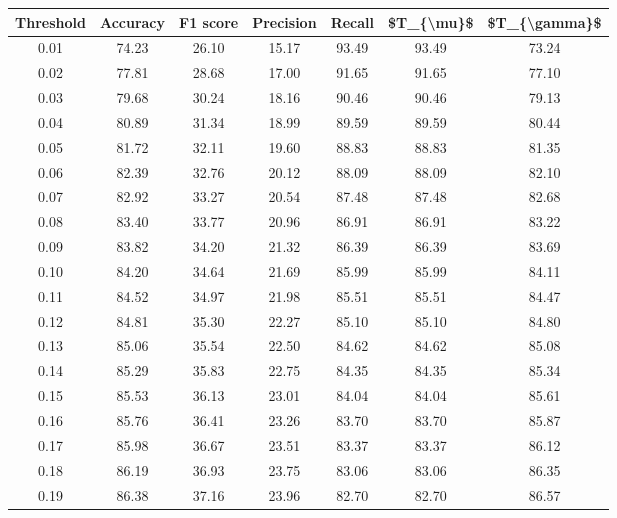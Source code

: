 \begin{tabular}{|c|c|c|c|c|c|c|}
\hline
 Threshold &  Accuracy &  F1 score &  Precision &  Recall &  \$T\_\{\textbackslash mu\}\$ &  \$T\_\{\textbackslash gamma\}\$ \\
\hline
      0.01 &     74.23 &     26.10 &      15.17 &   93.49 &      93.49 &         73.24 \\
      0.02 &     77.81 &     28.68 &      17.00 &   91.65 &      91.65 &         77.10 \\
      0.03 &     79.68 &     30.24 &      18.16 &   90.46 &      90.46 &         79.13 \\
      0.04 &     80.89 &     31.34 &      18.99 &   89.59 &      89.59 &         80.44 \\
      0.05 &     81.72 &     32.11 &      19.60 &   88.83 &      88.83 &         81.35 \\
      0.06 &     82.39 &     32.76 &      20.12 &   88.09 &      88.09 &         82.10 \\
      0.07 &     82.92 &     33.27 &      20.54 &   87.48 &      87.48 &         82.68 \\
      0.08 &     83.40 &     33.77 &      20.96 &   86.91 &      86.91 &         83.22 \\
      0.09 &     83.82 &     34.20 &      21.32 &   86.39 &      86.39 &         83.69 \\
      0.10 &     84.20 &     34.64 &      21.69 &   85.99 &      85.99 &         84.11 \\
      0.11 &     84.52 &     34.97 &      21.98 &   85.51 &      85.51 &         84.47 \\
      0.12 &     84.81 &     35.30 &      22.27 &   85.10 &      85.10 &         84.80 \\
      0.13 &     85.06 &     35.54 &      22.50 &   84.62 &      84.62 &         85.08 \\
      0.14 &     85.29 &     35.83 &      22.75 &   84.35 &      84.35 &         85.34 \\
      0.15 &     85.53 &     36.13 &      23.01 &   84.04 &      84.04 &         85.61 \\
      0.16 &     85.76 &     36.41 &      23.26 &   83.70 &      83.70 &         85.87 \\
      0.17 &     85.98 &     36.67 &      23.51 &   83.37 &      83.37 &         86.12 \\
      0.18 &     86.19 &     36.93 &      23.75 &   83.06 &      83.06 &         86.35 \\
      0.19 &     86.38 &     37.16 &      23.96 &   82.70 &      82.70 &         86.57 \\

\end{tabular}
